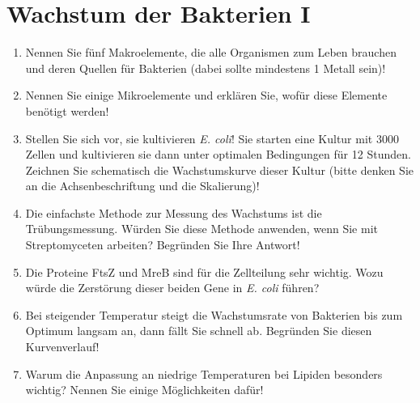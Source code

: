 
\section{Wachstum der Bakterien I}
\begin{enumerate}
	\item Nennen Sie fünf Makroelemente, die alle Organismen zum Leben brauchen und deren Quellen für Bakterien (dabei sollte mindestens 1 Metall sein)!
	\item Nennen Sie einige Mikroelemente und erklären Sie, wofür diese Elemente benötigt werden!
	\item Stellen Sie sich vor, sie kultivieren \emph{E. coli}! Sie starten eine Kultur mit 3000 Zellen und kultivieren sie dann unter optimalen Bedingungen für 12 Stunden. Zeichnen Sie schematisch die Wachstumskurve dieser Kultur (bitte denken Sie an die Achsenbeschriftung und die Skalierung)!
	\item Die einfachste Methode zur Messung des Wachstums ist die Trübungsmessung. Würden Sie diese Methode anwenden, wenn Sie mit Streptomyceten arbeiten? Begründen Sie Ihre Antwort!
	\item Die Proteine FtsZ und MreB sind für die Zellteilung sehr wichtig. Wozu würde die Zerstörung dieser beiden Gene in \emph{E. coli} führen?
	\item Bei steigender Temperatur steigt die Wachstumsrate von Bakterien bis zum Optimum langsam an, dann fällt Sie schnell ab. Begründen Sie diesen Kurvenverlauf!
	\item Warum die Anpassung an niedrige Temperaturen bei Lipiden besonders wichtig? Nennen Sie einige Möglichkeiten dafür!
\end{enumerate}
